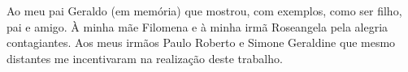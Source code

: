 \thispagestyle{empty}%
\null\vfill
\begin{flushright}
Ao meu pai Geraldo (em mem\'{o}ria) que mostrou, com exemplos, como ser filho, pai e amigo.
\`{A} minha m\~{a}e Filomena e \`{a} minha irm\~{a} Roseangela pela alegria contagiantes.
Aos meus irm\~{a}os Paulo Roberto e Simone Geraldine que mesmo distantes me incentivaram na realiza\c{c}\~{a}o deste trabalho.

\end{flushright}
